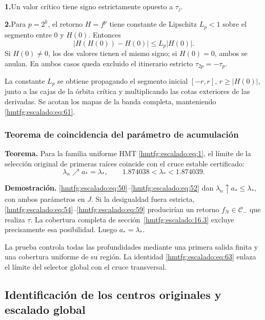\par\noindent\textbf{1.}\enspace Un valor crítico tiene signo estrictamente opuesto a \(\tau_j\).
\par\noindent\textbf{2.}\enspace Para \(p=2^k\), el retorno \(H=f^p\) tiene constante de Lipschitz \(L_p<1\) sobre el segmento entre \(0\) y \(H(0)\). Entonces
\[
|H(H(0))-H(0)|\le L_p|H(0)|.
\]
Si \(H(0)\ne0\), los dos valores tienen el mismo signo; si \(H(0)=0\), ambos se anulan. En ambos casos queda excluido el itinerario estricto \(\tau_{2p}=-\tau_p\).

La constante \(L_p\) se obtiene propagando el segmento inicial \([-r,r]\), \(r\ge|H(0)|\), junto a las cajas de la órbita crítica y multiplicando las cotas exteriores de las derivadas. Se acotan los mapas de la banda completa, manteniendo \eqref{hmtfg:escalado:eq:61}.

\subsubsection{Teorema de coincidencia del parámetro de acumulación}
\label{hmtfg:escalado:16.4}

\textbf{Teorema.} Para la familia uniforme HMT \eqref{hmtfg:escalado:eq:1}, el límite de la selección original de primeras raíces coincide con el cruce estable certificado:
\begin{equation}
\boxed{\lambda_n\nearrow a_*=\lambda_*,
\qquad 1.874038<\lambda_*<1.874039.}
\label{hmtfg:escalado:eq:63}
\end{equation}

\textbf{Demostración.} \eqref{hmtfg:escalado:eq:50}–\eqref{hmtfg:escalado:eq:52} dan \(\lambda_n\uparrow a_*\le\lambda_*\), con ambos parámetros en \(J\). Si la desigualdad fuera estricta, \eqref{hmtfg:escalado:eq:54}–\eqref{hmtfg:escalado:eq:59} producirían un retorno \(f_N\in\mathcal C_-\) que realiza \(\tau\). La cobertura completa de sección~\ref{hmtfg:escalado:16.3} excluye precisamente esa posibilidad. Luego \(a_*=\lambda_*\).

La prueba controla todas las profundidades mediante una primera salida finita y una cobertura uniforme de su región. La identidad \eqref{hmtfg:escalado:eq:63} enlaza el límite del selector global con el cruce transversal.


\subsection{Identificación de los centros originales y escalado global}
\label{hmtfg:escalado:17}

